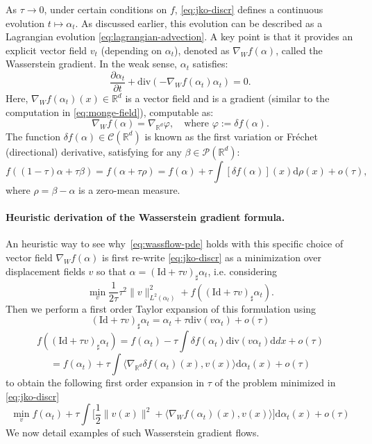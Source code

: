 As $\tau \to 0$, under certain conditions on $f$, \eqref{eq:jko-discr} defines a continuous evolution $t \mapsto \alpha_t$. As discussed earlier, this evolution can be described as a Lagrangian evolution \eqref{eq:lagrangian-advection}. A key point is that it provides an explicit vector field $v_t$ (depending on $\alpha_t$), denoted as $\nabla_W f(\alpha)$, called the Wasserstein gradient. In the weak sense, $\alpha_t$ satisfies:
\begin{equation}
    \frac{\partial \alpha_t}{\partial t} + \mathrm{div}(-\nabla_W f(\alpha_t) \alpha_t) = 0. \label{eq:wassflow-pde}
\end{equation}
Here, $\nabla_W f(\alpha_t)(x) \in \mathbb{R}^d$ is a vector field and is a gradient (similar to the computation in \eqref{eq:monge-field}), computable as:
\begin{equation}
    \nabla_W f(\alpha) = \nabla_{\mathbb{R}^d} \varphi, \quad \text{where } \varphi := \delta f(\alpha).
\end{equation}
The function $\delta f(\alpha) \in \mathcal{C}(\mathbb{R}^d)$ is known as the first variation or Fréchet (directional) derivative, satisfying for any $\beta \in \mathcal{P}(\mathbb{R}^d)$:
\begin{equation}
    f((1-\tau)\alpha + \tau \beta) = f(\alpha + \tau \rho) = f(\alpha) + \tau \int [\delta f(\alpha)](x) \mathrm{d} \rho(x) + o(\tau),
\end{equation}
where $\rho = \beta - \alpha$ is a zero-mean measure.

\paragraph{Heuristic derivation of the Wasserstein gradient formula.}

An heuristic way to see why~\eqref{eq:wassflow-pde} holds with this specific choice of vector field $\nabla_W f(\alpha)$ is first re-write \eqref{eq:jko-discr} as a minimization over displacement fields $v$ so that $\alpha = (\mathrm{Id} + \tau v)_\sharp \alpha_t$, i.e. considering
$$
	\min_{v} \frac{1}{2 \tau} \tau^2 \|v\|_{L^2(\alpha_t)}^2 + f( (\mathrm{Id} + \tau v)_\sharp \alpha_t ).
$$
Then we perform a first order Taylor expansion of this formulation using 
$$
	 (\mathrm{Id} + \tau v)_\sharp \alpha_t =  \alpha_t + \tau \mathrm{div}( v \alpha_t ) + o(\tau)
$$
$$
	f( (\mathrm{Id} + \tau v)_\sharp \alpha_t ) = f(\alpha_t) - \tau \int \delta f(\alpha_t) \mathrm{div}( v \alpha_t ) \mathrm{d} d x + o(\tau)
$$
$$
	 = f(\alpha_t) + \tau \int \langle \nabla_{\mathbb{R}^d} \delta f(\alpha_t)(x), v(x) \rangle \mathrm{d} \alpha_t(x) + o(\tau)
$$
to obtain the following first order expansion in $\tau$ of the problem minimized in  \eqref{eq:jko-discr}
$$
	 \min_{v} f(\alpha_t) +  \tau \int \Big[ \frac{1}{2} \|v(x)\|^2 + \langle \nabla_{W} f(\alpha_t)(x), v(x) \rangle \Big]\mathrm{d} \alpha_t(x) + o(\tau)
$$
We now detail examples of such Wasserstein gradient flows.

